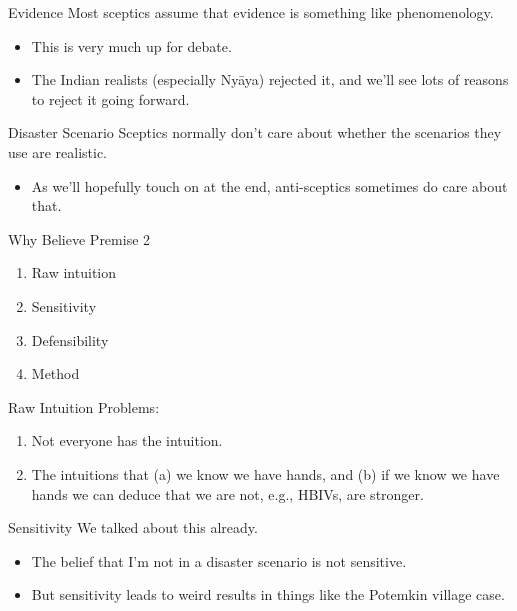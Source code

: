 \documentclass[
  17pt,
  letterpaper,
  ignorenonframetext,
  aspectratio=169,
]{beamer}
\providecommand{\tightlist}{%
  \setlength{\itemsep}{0pt}\setlength{\parskip}{0pt}}\usepackage{longtable,booktabs,array}
\begin{document}
\begin{frame}{Evidence}
\protect\hypertarget{evidence}{}
Most sceptics assume that evidence is something like phenomenology.

\begin{itemize}[<+->]
\tightlist
\item
  This is very much up for debate.
\item
  The Indian realists (especially Nyāya) rejected it, and we'll see lots
  of reasons to reject it going forward.
\end{itemize}
\end{frame}

\begin{frame}{Disaster Scenario}
\protect\hypertarget{disaster-scenario}{}
Sceptics normally don't care about whether the scenarios they use are
realistic.

\begin{itemize}[<+->]
\tightlist
\item
  As we'll hopefully touch on at the end, anti-sceptics sometimes do
  care about that.
\end{itemize}
\end{frame}

\begin{frame}{Why Believe Premise 2}
\protect\hypertarget{why-believe-premise-2}{}
\begin{enumerate}[<+->]
\tightlist
\item
  Raw intuition
\item
  Sensitivity
\item
  Defensibility
\item
  Method
\end{enumerate}
\end{frame}

\begin{frame}{Raw Intuition}
\protect\hypertarget{raw-intuition}{}
Problems:

\begin{enumerate}[<+->]
\tightlist
\item
  Not everyone has the intuition.
\item
  The intuitions that (a) we know we have hands, and (b) if we know we
  have hands we can deduce that we are not, e.g., HBIVs, are stronger.
\end{enumerate}
\end{frame}

\begin{frame}{Sensitivity}
\protect\hypertarget{sensitivity}{}
We talked about this already.

\begin{itemize}[<+->]
\tightlist
\item
  The belief that I'm not in a disaster scenario is not sensitive.
\item
  But sensitivity leads to weird results in things like the Potemkin
  village case.
\end{itemize}
\end{frame}
\end{document}
